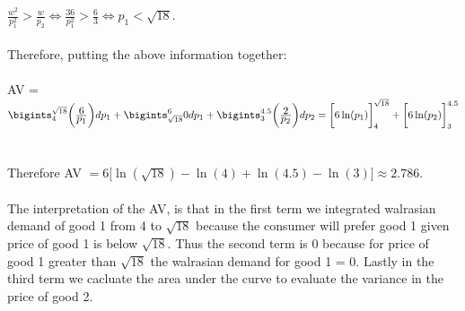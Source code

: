 \documentclass[12pt]{article}
\newenvironment{problem}[2][Problem]{\begin{trivlist}
\item[\hskip \labelsep {\bfseries #1}\hskip \labelsep {\bfseries #2.}]}{\end{trivlist}}
\newcommand\ddfrac[2]{\frac{\displaystyle #1}{\displaystyle #2}}
\begin{document}
\begin{problem}{4}
\\
\\
$\ddfrac{w^2}{p_1^2}  > \ddfrac{w}{p_2} \iff \ddfrac{36}{p_1^2} > \ddfrac{6}{3} \iff p_1 < \sqrt{18} $.
\\
\\
Therefore, putting the above information together:
\\
\\
AV = $ \bigints_{4}^{\sqrt{18}} \bigg(\ddfrac{6}{ p_1}\bigg)dp_1 + \bigints_{\sqrt{18}}^{6} 0dp_1 +  \bigints_{3}^{4.5} \bigg(\ddfrac{2}{  p_2}\bigg) dp_2  = \bigg[ 6 \ln (p_1)\bigg]_4^{\sqrt{18}} + \bigg[ 6 \ln (p_2)\bigg]_3^{4.5}$
\\
\\
\\
Therefore AV $= 6\bigg[ \ln(\sqrt{18}) - \ln(4)  + \ln(4.5) - \ln(3) \bigg] \approx 2.786$. \\
\\
The interpretation of the AV, is that in the first term we integrated walrasian demand of good 1 from 4 to $ \sqrt{18} $ because the consumer will prefer good 1 given price of good 1 is below $ \sqrt{18} $. Thus the second term is 0 because for price of good 1 greater than $ \sqrt{18} $ the walrasian demand for good 1 = 0. Lastly in the third term we cacluate the area under the curve to evaluate the variance in the price of good 2. 
\end{problem}
\end{document}
